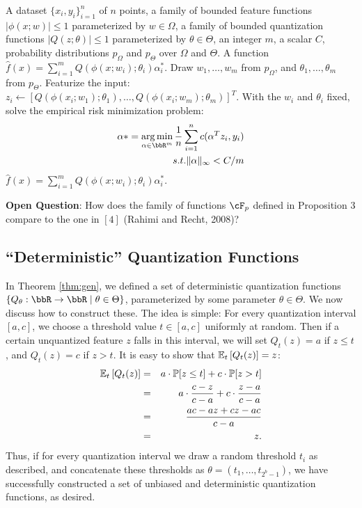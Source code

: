\documentclass[12pt]{article}
\begin{document}
\begin{algorithm}
\caption{%
	Low-Precision Weighted Sum of Random Kitchen Sinks Training (adapted from $[4]$)%
}
\label{alg:lprff}
\begin{algorithmic}[1]
	\renewcommand{\algorithmicrequire}{\textbf{Input}}
	\REQUIRE
	A dataset $\{x_i,y_i\}_{i=1}^n$ of $n$ points, a family of bounded feature functions $|\phi(x;w)|\leq 1$ parameterized by $w\in\Omega$, a family of bounded quantization functions $|Q(z;\theta)| \leq 1$ parameterized by $\theta \in \Theta$, an integer $m$, a scalar $C$, probability distributions  $p_{\Omega}$ and $p_{\Theta}$ over $\Omega$ and $\Theta$.
	\renewcommand{\algorithmicrequire}{\textbf{Output}}
	\REQUIRE
	A function $\hat{f}(x) = \sum_{i=1}^m Q(\phi(x;w_i);\theta_i) \alpha^*_i$.
	\STATE Draw $w_1,\ldots,w_m$ from $p_{\Omega}$, and $\theta_1,\ldots,\theta_m$ from $p_{\Theta}$.
	\STATE Featurize the input: $z_i \leftarrow [Q(\phi(x_i;w_1);\theta_1),\ldots,Q(\phi(x_i;w_m);\theta_m)]^T$.
	\STATE With the $w_i$ and $\theta_i$ fixed, solve the empirical risk minimization problem:
	\begin{eqnarray*}
		\alpha* =\argmin_{\alpha\in\RR^m} \frac{1}{n}\sum_{i=1}^n c(\alpha^T z_i,y_i)\\
		s.t. \|\alpha\|_\infty < C/m
	\end{eqnarray*}
	\RETURN $\hat{f}(x) = \sum_{i=1}^m Q(\phi(x;w_i);\theta_i) \alpha^*_i$.
\end{algorithmic}
\end{algorithm}


\noindent \textbf{Open Question}: How does the family of functions $\cF_p$ defined in Proposition 3 compare to the one in $[4]$ (Rahimi and Recht, 2008)?	

\subsection{``Deterministic'' Quantization Functions}
In Theorem \ref{thm:gen}, we defined a set of deterministic quantization functions
$\{Q_{\theta}:\RR\rightarrow\RR \;|\; \theta\in\Theta \}$, parameterized by some parameter $\theta\in\Theta$.
We now discuss how to construct these.  The idea is simple: For every quantization interval $[a,c]$, we choose a threshold value $t \in [a,c]$ uniformly at random.  Then if a certain unquantized feature $z$ falls in this interval, we will set $Q_t(z)= a$ if $z \leq t$, and $Q_t(z) = c$ if $z > t$.  It is easy to show that $\expect{t}{Q_t(z)} = z$:
\begin{eqnarray*}
	\expect{t}{Q_t(z)} &=& a \cdot \Prob[z \leq t] + c \cdot \Prob[z > t]  \\
	&=& a \cdot \frac{c-z}{c-a} + c\cdot \frac{z-a}{c-a} \\
	&=& \frac{ac - az + cz - ac}{c-a} \\
	&=& z.
\end{eqnarray*}
Thus, if for every quantization interval we draw a random threshold $t_i$ as described, and concatenate these thresholds as $\theta = (t_1,\ldots,t_{2^b-1})$, we have successfully constructed a set of unbiased and deterministic quantization functions, as desired.
\end{document}
